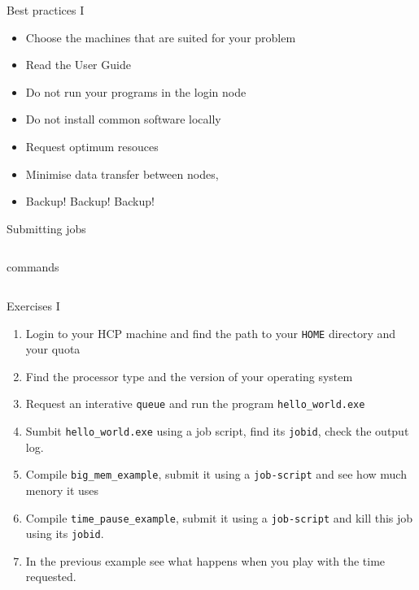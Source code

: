 \documentclass{beamer}
\begin{document}
\begin{frame}{Best practices I}
  \begin{itemize}
    \item Choose the machines that are suited for your problem
    \item Read the User Guide
    \item Do not run your programs in the login node
    \item Do not install common software locally
    \item Request optimum resouces
    \item Minimise data transfer between nodes,
    \item \alert{Backup! Backup! Backup!}
  \end{itemize}
\end{frame}

\begin{frame}[fragile]{Submitting jobs}
  \fontsize{9pt}{9}\selectfont
  \begin{columns}
    \begin{block}{commands}
      
    \end{block}

    \begin{example}
      
    \end{example}
  \end{columns}
\end{frame}

\begin{frame}{Exercises I}
  \fontsize{10pt}{8}\selectfont
  \begin{enumerate}
    \item Login to your HCP machine and find the path to your \texttt{HOME}
    directory and your quota
    \item Find the processor type and the version of your operating system
    \item Request an interative \texttt{queue} and run the program \texttt{hello\_world.exe}
    \item Sumbit \texttt{hello\_world.exe} using a job script, find its \texttt{jobid}, check the output log.
    \item Compile \texttt{big\_mem\_example}, submit it using a \texttt{job-script} and see how much menory it uses
    \item Compile \texttt{time\_pause\_example}, submit it using a \texttt{job-script} and kill this job using its \texttt{jobid}.
    \item In the previous example see what happens when you play with the time requested.
  \end{enumerate}
\end{frame}
\end{document}
